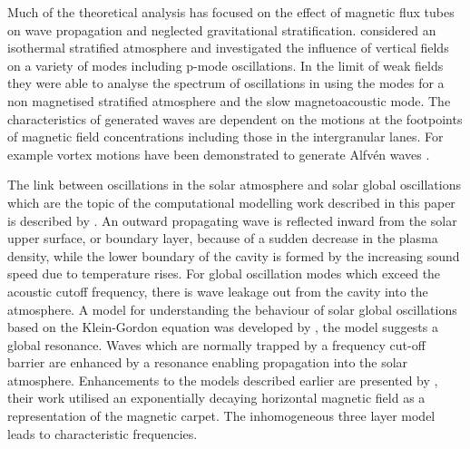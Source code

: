 \documentclass[linenumbers]{aastex63}
\begin{document}
 Much of the theoretical analysis has focused on the effect of magnetic flux tubes on wave propagation and neglected gravitational stratification. \citet{Hasan1992} considered an isothermal stratified atmosphere and investigated the influence of vertical fields on a variety of modes including p-mode oscillations. In the limit of weak fields they were able to analyse the spectrum of oscillations in using the modes for a non magnetised stratified atmosphere and the slow magnetoacoustic mode.  The characteristics of generated waves are dependent on the motions at the footpoints of magnetic field concentrations including those in the intergranular lanes. For example vortex motions have been demonstrated to generate Alfv\'en waves \citet{Fedun2009b}.  

The link between oscillations in the solar atmosphere and solar global oscillations which are the topic of the computational modelling work described in this paper is described by \citet{Erdelyi2006}.
 An outward propagating wave is reflected inward from the solar upper surface, or boundary layer, because of a sudden decrease in the plasma density, while the lower boundary of the cavity is formed by the increasing sound speed due to temperature rises. For global oscillation modes which exceed the acoustic cutoff frequency, there is wave leakage out from the cavity into the atmosphere. A model for understanding the behaviour of solar global oscillations based on the Klein-Gordon equation was developed by \citet{Taroyan2008}, the model suggests a global resonance. Waves which are normally trapped by a frequency cut-off barrier are enhanced by a resonance enabling propagation into the solar atmosphere. Enhancements to the models described earlier are presented by \citet{Pinter2007}, their work utilised an exponentially decaying horizontal magnetic field as a representation of the magnetic carpet. The inhomogeneous three layer model leads to characteristic frequencies. 

 
\end{document}
